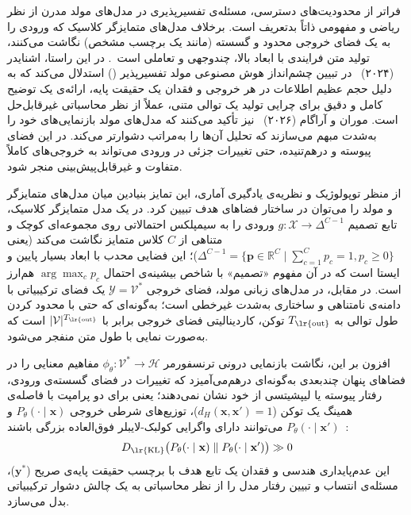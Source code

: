 فراتر از محدودیت‌های دسترسی، مسئله‌ی تفسیرپذیری در مدل‌های مولد مدرن از نظر ریاضی و مفهومی ذاتاً بدتعریف است. برخلاف مدل‌های متمایزگر کلاسیک که ورودی را به یک فضای خروجی محدود و گسسته (مانند یک برچسب مشخص) نگاشت می‌کنند، تولید متن فرایندی با ابعاد بالا، چندوجهی و تعاملی است~\cite{schneider2024explainable}. در این راستا، اشنایدر (۲۰۲۴)~\cite{schneider2024explainable} در تبیین چشم‌انداز هوش مصنوعی مولد تفسیرپذیر () استدلال می‌کند که به دلیل حجم عظیم اطلاعات در هر خروجی و فقدان یک حقیقت پایه، ارائه‌ی یک توضیح کامل و دقیق برای چرایی تولید یک توالی متنی، عملاً از نظر محاسباتی غیرقابل‌حل است. موران و آراگام (۲۰۲۶)~\cite{moran2026towardinterpretable} نیز تأکید می‌کنند که مدل‌های مولد بازنمایی‌های خود را به‌شدت مبهم می‌سازند که تحلیل آن‌ها را به‌مراتب دشوارتر می‌کند. در این فضای پیوسته و درهم‌تنیده، حتی تغییرات جزئی در ورودی می‌تواند به خروجی‌های کاملاً متفاوت و غیرقابل‌پیش‌بینی منجر شود.

از منظر توپولوژیک و نظریه‌ی یادگیری آماری، این تمایز بنیادین میان مدل‌های متمایزگر و مولد را می‌توان در ساختار فضاهای هدف تبیین کرد. در یک مدل متمایزگر کلاسیک، تابع تصمیم $g: \mathcal{X} \to \Delta^{C-1}$ ورودی را به سیمپلکس احتمالاتی روی مجموعه‌ای کوچک و متناهی از $C$ کلاس متمایز نگاشت می‌کند (یعنی $\Delta^{C-1} = \{ \mathbf{p} \in \mathbb{R}^C \mid \sum_{c=1}^C p_c = 1, p_c \ge 0 \}$)؛ این فضایی محدب با ابعاد بسیار پایین و ایستا است که در آن مفهوم «تصمیم» با شاخص بیشینه‌ی احتمال $\arg\max_c p_c$ هم‌ارز است. در مقابل، در مدل‌های زبانی مولد، فضای خروجی $\mathcal{Y} = \mathcal{V}^*$ یک فضای ترکیبیاتی با دامنه‌ی نامتناهی و ساختاری به‌شدت غیرخطی است؛ به‌گونه‌ای که حتی با محدود کردن طول توالی به $T_{\text{\lr{out}}}$ توکن، کاردینالیتی فضای خروجی برابر با $|\mathcal{V}|^{T_{\text{\lr{out}}}}$ است که به‌صورت نمایی با طول متن منفجر می‌شود. 

افزون بر این، نگاشت بازنمایی درونی ترنسفورمر $\phi_\theta: \mathcal{V}^* \to \mathcal{H}$ مفاهیم معنایی را در فضاهای پنهان چندبعدی به‌گونه‌ای درهم‌می‌آمیزد که تغییرات در فضای گسسته‌ی ورودی، رفتار پیوسته یا لیپشیتسی از خود نشان نمی‌دهند؛ یعنی برای دو پرامپت با فاصله‌ی همینگ یک توکن ($d_H(\mathbf{x}, \mathbf{x}') = 1$)، توزیع‌های شرطی خروجی $P_\theta(\cdot \mid \mathbf{x})$ و $P_\theta(\cdot \mid \mathbf{x}')$ می‌توانند دارای واگرایی کولبک-لایبلر فوق‌العاده بزرگی باشند~\cite{zou2023universal}:
\begin{equation}\label{eq:chap1_kl_divergence}
    D_{\text{\lr{KL}}}\big(P_\theta(\cdot \mid \mathbf{x}) \parallel P_\theta(\cdot \mid \mathbf{x}')\big) \gg 0
\end{equation}
این عدم‌پایداری هندسی و فقدان یک تابع هدف با برچسب حقیقت پایه‌ی صریح ($\mathbf{y}^*$)، مسئله‌ی انتساب و تبیین رفتار مدل را از نظر محاسباتی به یک چالش دشوار ترکیبیاتی بدل می‌سازد.

